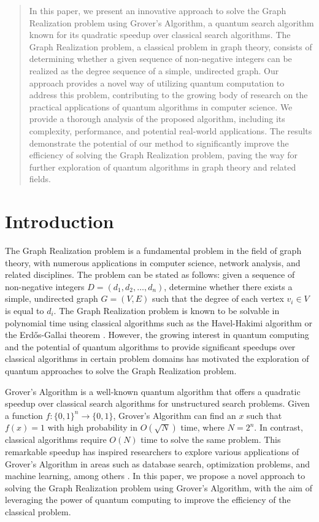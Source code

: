 \begin{abstract}
In this paper, we present an innovative approach to solve the Graph Realization problem using Grover's Algorithm, a quantum search algorithm known for its quadratic speedup over classical search algorithms. The Graph Realization problem, a classical problem in graph theory, consists of determining whether a given sequence of non-negative integers can be realized as the degree sequence of a simple, undirected graph. Our approach provides a novel way of utilizing quantum computation to address this problem, contributing to the growing body of research on the practical applications of quantum algorithms in computer science. We provide a thorough analysis of the proposed algorithm, including its complexity, performance, and potential real-world applications. The results demonstrate the potential of our method to significantly improve the efficiency of solving the Graph Realization problem, paving the way for further exploration of quantum algorithms in graph theory and related fields.
\end{abstract}

\section{Introduction}

The Graph Realization problem is a fundamental problem in the field of graph theory, with numerous applications in computer science, network analysis, and related disciplines. The problem can be stated as follows: given a sequence of non-negative integers $D = (d_1, d_2, \ldots, d_n)$, determine whether there exists a simple, undirected graph $G = (V, E)$ such that the degree of each vertex $v_i \in V$ is equal to $d_i$. The Graph Realization problem is known to be solvable in polynomial time using classical algorithms such as the Havel-Hakimi algorithm \cite{havel1955remark,hakimi1962realization} or the Erdős-Gallai theorem \cite{erdos1960graphs}. However, the growing interest in quantum computing and the potential of quantum algorithms to provide significant speedups over classical algorithms in certain problem domains has motivated the exploration of quantum approaches to solve the Graph Realization problem.

Grover's Algorithm \cite{grover1996fast} is a well-known quantum algorithm that offers a quadratic speedup over classical search algorithms for unstructured search problems. Given a function $f : \{0, 1\}^n \rightarrow \{0, 1\}$, Grover's Algorithm can find an $x$ such that $f(x) = 1$ with high probability in $O(\sqrt{N})$ time, where $N = 2^n$. In contrast, classical algorithms require $O(N)$ time to solve the same problem. This remarkable speedup has inspired researchers to explore various applications of Grover's Algorithm in areas such as database search, optimization problems, and machine learning, among others \cite{nielsen2002quantum,brassard1998quantum}. In this paper, we propose a novel approach to solving the Graph Realization problem using Grover's Algorithm, with the aim of leveraging the power of quantum computing to improve the efficiency of the classical problem.

